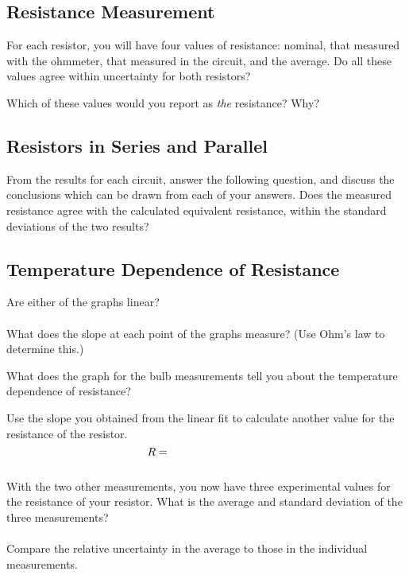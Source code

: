 \subsection{Resistance Measurement}
For each resistor, you will have four values of resistance: nominal, that
measured with the ohmmeter, that measured in the circuit, and the average. 
Do all these values agree within uncertainty for both resistors? 
  
\vspace*{1cm}
\noindent
Which of these values would you report as {\it the} resistance? Why?
\indent


\subsection{Resistors in Series and Parallel}
From the results for each circuit, answer the following question, and discuss
the conclusions which can be drawn from each of your answers. 
Does the measured resistance agree with the 
calculated equivalent resistance, within the standard deviations of the 
two results? 

\subsection{Temperature Dependence of Resistance}

\noindent
Are either of the graphs linear?\\ 
\ \\
\noindent
What does the slope at each point of the graphs measure? (Use Ohm's law to
determine this.) 
\vspace*{2cm}

\noindent
What does the graph for the bulb measurements tell you about the temperature
dependence of resistance? 
\vspace*{2cm}

\noindent
Use the slope you obtained from the linear fit to calculate another value
for the resistance of the resistor. \\
\vspace*{2mm}
$$R=\mbox{\hspace*{3cm}}$$
\vspace*{1mm}\\
With the two other measurements, you now
have three experimental values for the resistance of your resistor. 
What is the average and standard deviation of the three measurements? \\
\vspace*{1.5cm} \\
Compare the relative uncertainty in the average to those in the individual 
measurements. \\

